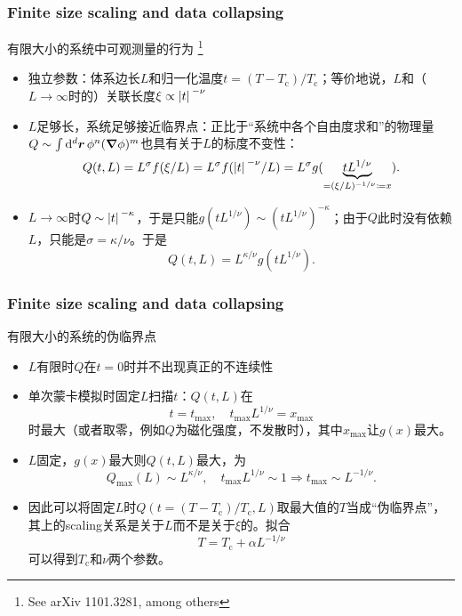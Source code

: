 \documentclass[UTF8]{ctexbeamer}
\begin{document}
\begin{frame}
\frametitle{Finite size scaling and data collapsing}

有限大小的系统中可观测量的行为%
\footnote{See arXiv 1101.3281, among others}

\begin{itemize}
    \item 独立参数：体系边长$L$和归一化温度$t = (T - T_\text{c}) / T_\text{c}$；等价地说，$L$和（$L \to \infty$时的）关联长度$\xi \propto \abs*{t}^{- \nu}$
    \item $L$足够长，系统足够接近临界点：正比于“系统中各个自由度求和”的物理量$Q \sim \int \dd[d]{\vb*{r}} \phi^n (\grad{\phi})^m$也具有关于$L$的标度不变性：
    \[
        Q(t, L) = L^\sigma f(\xi / L) = L^{\sigma} f(\abs*{t}^{- \nu} / L) = L^\sigma g(\underbrace{t L^{1 / \nu}}_{= (\xi / L)^{- 1 / \nu} \coloneqq x}).
    \]
    \item $L \to \infty$时$Q \sim \abs*{t}^{- \kappa}$，于是只能$g(t L^{1 / \nu}) \sim (t L^{1 / \nu})^{- \kappa}$；由于$Q$此时没有依赖$L$，只能是$\sigma = \kappa / \nu$。于是
    \begin{equation}
        Q(t, L) = L^{\kappa / \nu} g(t L^{1 / \nu}).
    \end{equation}
\end{itemize}    

\end{frame}

\begin{frame}
\frametitle{Finite size scaling and data collapsing}

有限大小的系统的伪临界点

\begin{itemize}
    \item $L$有限时$Q$在$t=0$时并不出现真正的不连续性
    \item 单次蒙卡模拟时固定$L$扫描$t$：$Q(t, L)$在
    \begin{equation}
        t = t_\text{max}, \quad t_\text{max} L^{1 / \nu} = x_\text{max}
    \end{equation}
    时最大（或者取零，例如$Q$为磁化强度，不发散时），其中$x_\text{max}$让$g(x)$最大。
    \item $L$固定，$g(x)$最大则$Q(t, L)$最大，为
    \begin{equation}
        Q_\text{max}(L) \sim L^{\kappa / \nu}, \quad t_\text{max} L^{1 / \nu} \sim 1 \Rightarrow t_\text{max} \sim L^{- 1 / \nu}.
    \end{equation}
    \item 因此可以将固定$L$时$Q(t = (T - T_\text{c}) / T_\text{c}, L)$取最大值的$T$当成“伪临界点”，其上的scaling关系是关于$L$而不是关于$\xi$的。拟合
    \begin{equation}
        T = T_\text{c} + \alpha L^{- 1 / \nu}
    \end{equation}
    可以得到$T_\text{c}$和$\nu$两个参数。
\end{itemize}

\end{frame}
\end{document}
